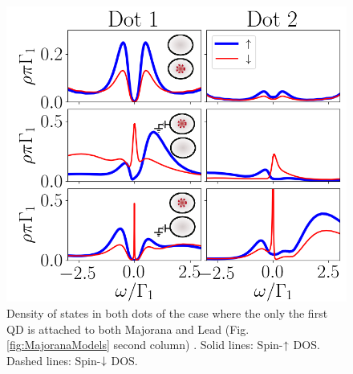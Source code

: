 \documentclass[showpacs,aps,prb,reprint,superscriptaddress]{revtex4-1}
\begin{document}
\begin{figure}[bt]
\begin{center}
\includegraphics[scale=0.45]{Graficos/Nt1>0.png}
\caption{  \label{fig:Interference} Density of states in both dots of the case where the only the first QD is attached to both Majorana and Lead (Fig.\ref{fig:MajoranaModels} second column) . Solid lines: Spin-$\uparrow$ DOS. Dashed lines: Spin-$\downarrow$ DOS.
}
%
\label{fig:GenModel}
\end{center}
\end{figure}
\end{document}
